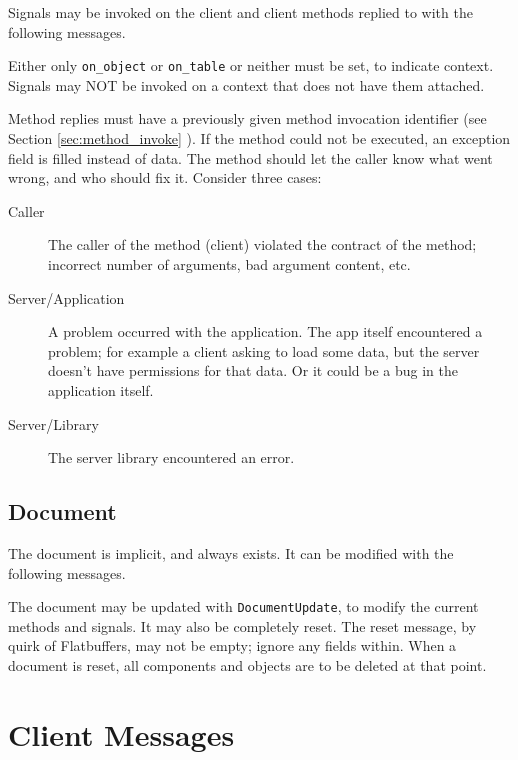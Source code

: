 \documentclass[11pt, oneside]{amsart}
\begin{document}
Signals may be invoked on the client and client methods replied to with the following messages.



Either only \texttt{on\_object} or \texttt{on\_table} or neither must be set, to indicate context. Signals may NOT be invoked on a context that does not have them attached.

Method replies must have a previously given method invocation identifier (see Section \ref{sec:method_invoke} ). If the method could not be executed, an exception field is filled instead of data. The method should let the caller know what went wrong, and who should fix it. Consider three cases:

\begin{description}
	\item[Caller] The caller of the method (client) violated the contract of the method; incorrect number of arguments, bad argument content, etc.
	\item[Server/Application] A problem occurred with the application. The app itself encountered a problem; for example a client asking to load some data, but the server doesn't have permissions for that data. Or it could be a bug in the application itself.
	\item[Server/Library] The server library encountered an error. 
\end{description}

\subsection{Document}

The document is implicit, and always exists. It can be modified with the following messages.



The document may be updated with \texttt{DocumentUpdate}, to modify the current methods and signals. It may also be completely reset. The reset message, by quirk of Flatbuffers, may not be empty; ignore any fields within. When a document is reset, all components and objects are to be deleted at that point.

\section{Client Messages}
\end{document}
